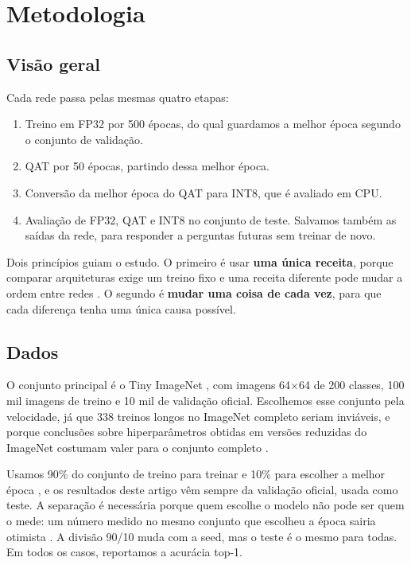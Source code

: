 \documentclass[conference]{IEEEtran}
\newcommand{\by}{\ensuremath{\times}}
\begin{document}
\section{Metodologia}
\label{sec:metodo}

\subsection{Visão geral}

Cada rede passa pelas mesmas quatro etapas:
\begin{enumerate}
\item Treino em FP32 por 500 épocas, do qual guardamos a melhor época segundo o conjunto de validação.
\item QAT por 50 épocas, partindo dessa melhor época.
\item Conversão da melhor época do QAT para INT8, que é avaliado em CPU.
\item Avaliação de FP32, QAT e INT8 no conjunto de teste. Salvamos também as saídas da rede, para responder a perguntas futuras sem treinar de novo.
\end{enumerate}

Dois princípios guiam o estudo. O primeiro é usar \textbf{uma única receita}, porque comparar arquiteturas exige um treino fixo
\cite{radosavovic2019network} e uma receita diferente pode mudar a ordem entre redes \cite{bello2021revisiting,wightman2021resnet}. O
segundo é \textbf{mudar uma coisa de cada vez}, para que cada diferença tenha uma única causa possível.

\subsection{Dados}

O conjunto principal é o Tiny ImageNet \cite{le2015tiny}, com imagens 64\by64 de 200 classes, 100 mil imagens de treino e 10 mil de
validação oficial. Escolhemos esse conjunto pela velocidade, já que 338 treinos longos no ImageNet completo seriam inviáveis, e porque
conclusões sobre hiperparâmetros obtidas em versões reduzidas do ImageNet costumam valer para o conjunto completo
\cite{chrabaszcz2017downsampled}.

Usamos 90\% do conjunto de treino para treinar e 10\% para escolher a melhor época \cite{he2016deep}, e os resultados deste artigo vêm
sempre da validação oficial, usada como teste. A separação é necessária porque quem escolhe o modelo não pode ser quem o mede: um
número medido no mesmo conjunto que escolheu a época sairia otimista \cite{cawley2010overfitting}. A divisão 90/10 muda com a seed, mas
o teste é o mesmo para todas. Em todos os casos, reportamos a acurácia top-1.
\end{document}
